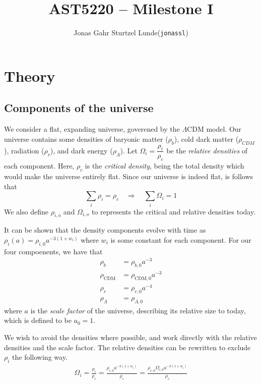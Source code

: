 \documentclass[a4paper]{article}
\begin{document}
\title{AST5220 -- Milestone I}
\author{
    \begin{tabular}{r l}
        Jonas Gahr Sturtzel Lunde & (\texttt{jonassl})
    \end{tabular}}

\maketitle
\vspace{2cm}

\section{Theory}
\subsection{Components of the universe}
We consider a flat, expanding universe, goverened by the $\Lambda \text{CDM}$ model. Our universe contains some densities of baryonic matter ($\rho_b$), cold dark matter ($\rho_{CDM}$), radiation ($\rho_r$), and dark energy ($\rho_\Lambda$). Let $\Omega_i = \dfrac{\rho_i}{\rho_c}$ be the \textit{relative densities} of each component. Here, $\rho_c$ is the \textit{critical density}, being the total density which would make the universe entirely flat. Since our universe is indeed flat, is follows that
\begin{equation*}
    \sum_i \rho_i = \rho_c \quad \Rightarrow \quad \sum_i \Omega_i = 1
\end{equation*}
We also define $\rho_{i,o}$ and $\Omega_{i,o}$ to represents the critical and relative densities today.

It can be shown that the density components evolve with time as $\rho_i(a) = \rho_{i,0}a^{-3(1+w_i)}$ where $w_i$ is some constant for each component. For our four compoenents, we have that
\begin{align*}
    \rho_b &= \rho_{b,0} a^{-3} \\
    \rho_\text{CDM} &= \rho_{\text{CDM},0} a^{-3} \\
    \rho_r &= \rho_{r,0} a^{-4} \\
    \rho_\Lambda &= \rho_{\Lambda,0}
\end{align*}
where $a$ is the \textit{scale factor} of the universe, describing its relative size to today, which is defined to be $a_0 = 1$.

We wish to avoid the densities where possible, and work directly with the relative densities and the scale factor. The relative densities can be rewritten to exclude $\rho_i$ the following way.
\begin{align*}
    \Omega_{i} = \frac{\rho_i}{\rho_c} = \frac{\rho_{i,0}a^{-3(1+w_i)}}{\rho_c} = \frac{\rho_{c,0}\Omega_{i,0}a^{-3(1+w_i)}}{\rho_c}
\end{align*}
\end{document}

